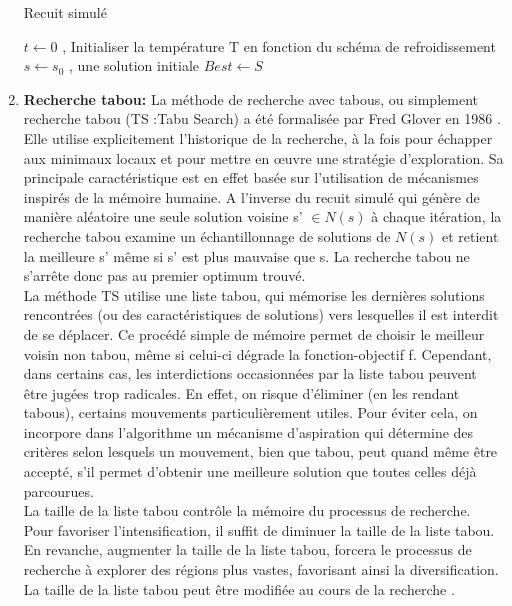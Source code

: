 \begin{enumerate}[label=\alph*)]
\begin{algorithm}[H]
\caption{Recuit simulé }
\SetAlgoLined
\DontPrintSemicolon
$ t \gets 0 $ , Initialiser la température T en fonction du schéma de refroidissement \;
$ s\gets s_0 $ , une solution initiale \;
$ Best \gets S $ \;
\end{algorithm}

	\item \textbf{Recherche tabou: } La méthode de recherche avec tabous, ou simplement recherche tabou (TS :Tabu Search) a été formalisée par Fred Glover en 1986 \cite{glover1986future} . Elle utilise explicitement l’historique de la recherche, à la fois pour échapper aux minimaux locaux et pour mettre en œuvre une stratégie d’exploration. Sa principale caractéristique est en effet basée sur  l’utilisation de mécanismes inspirés de la mémoire humaine. A l'inverse du recuit simulé qui génère de manière aléatoire une seule solution voisine s’ \( \in N(s) \) à chaque itération, la recherche tabou examine un échantillonnage de solutions de \( N(s) \) et retient la meilleure s’ même si s’ est plus mauvaise que s. La recherche tabou ne s'arrête donc pas au premier optimum trouvé. \\
	La méthode TS utilise une liste tabou, qui mémorise les dernières solutions rencontrées (ou des caractéristiques de solutions) vers lesquelles il est interdit de se déplacer. Ce procédé simple de mémoire permet de choisir le meilleur voisin non tabou, même si celui-ci dégrade la fonction-objectif f. Cependant, dans certains cas, les interdictions occasionnées par la liste tabou peuvent être jugées trop radicales. En effet, on risque d’éliminer (en les rendant tabous), certains mouvements particulièrement utiles. Pour éviter cela, on incorpore dans l’algorithme un mécanisme d’aspiration
qui détermine des critères selon lesquels un mouvement, bien que tabou, peut quand même être
accepté, s’il permet d’obtenir une meilleure solution que toutes celles déjà parcourues. \\
La taille de la liste tabou contrôle la mémoire du processus de recherche. Pour favoriser l’intensification, il suffit de diminuer la taille de la liste tabou. En revanche, augmenter la taille de la liste tabou, forcera le processus de recherche à explorer des régions plus vastes, favorisant ainsi la diversification. La taille de la liste tabou peut être modifiée au cours de la recherche \cite{battiti1994reactive} .\\

\end{enumerate}
